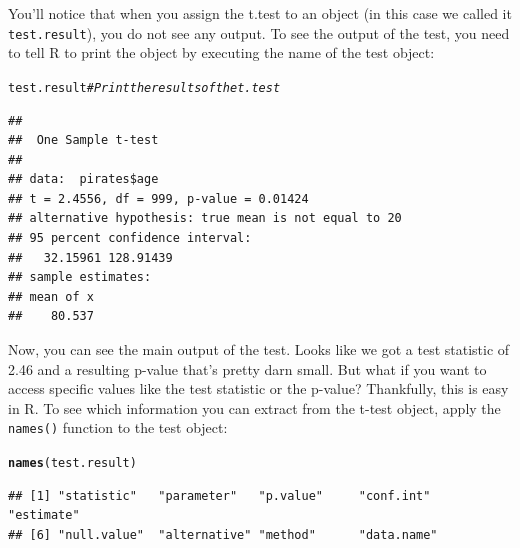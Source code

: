 \documentclass{tufte-book}\usepackage[]{graphicx}\usepackage[]{color}
\makeatletter
\newcommand{\hlcom}[1]{\textcolor[rgb]{0.678,0.584,0.686}{\textit{#1}}}%
\newcommand{\hlstd}[1]{\textcolor[rgb]{0.345,0.345,0.345}{#1}}%
\newcommand{\hlkwd}[1]{\textcolor[rgb]{0.737,0.353,0.396}{\textbf{#1}}}%
\newenvironment{kframe}{%
 \def\at@end@of@kframe{}%
 \ifinner\ifhmode%
  \def\at@end@of@kframe{\end{minipage}}%
  \begin{minipage}{\columnwidth}%
 \fi\fi%
 \def\FrameCommand##1{\hskip\@totalleftmargin \hskip-\fboxsep
 \colorbox{shadecolor}{##1}\hskip-\fboxsep
     \hskip-\linewidth \hskip-\@totalleftmargin \hskip\columnwidth}%
 \MakeFramed {\advance\hsize-\width
   \@totalleftmargin\z@ \linewidth\hsize
   \@setminipage}}%
 {\par\unskip\endMakeFramed%
 \at@end@of@kframe}
\newenvironment{knitrout}{}{} %
\makeatother
\begin{document}
\begin{footnotesize}
You'll notice that when you assign the t.test to an object (in this case we called it \texttt{test.result}), you do not see any output. To see the output of the test, you need to tell R to print the object by executing the name of the test object:

\begin{footnotesize}
\begin{knitrout}
\color{fgcolor}\begin{kframe}
\begin{alltt}
\hlstd{test.result}  \hlcom{# Print the results of the t.test}
\end{alltt}
\begin{verbatim}
## 
## 	One Sample t-test
## 
## data:  pirates$age
## t = 2.4556, df = 999, p-value = 0.01424
## alternative hypothesis: true mean is not equal to 20
## 95 percent confidence interval:
##   32.15961 128.91439
## sample estimates:
## mean of x 
##    80.537
\end{verbatim}
\end{kframe}
\end{knitrout}
\end{footnotesize}

Now, you can see the main output of the test. Looks like we got a test statistic of 2.46 and a resulting p-value that's pretty darn small. But what if you want to access specific values like the test statistic or the p-value? Thankfully, this is easy in R. To see which information you can extract from the t-test object, apply the \texttt{names()} function to the test object:


\begin{footnotesize}
\begin{knitrout}
\color{fgcolor}\begin{kframe}
\begin{alltt}
\hlkwd{names}\hlstd{(test.result)}
\end{alltt}
\begin{verbatim}
## [1] "statistic"   "parameter"   "p.value"     "conf.int"    "estimate"   
## [6] "null.value"  "alternative" "method"      "data.name"
\end{verbatim}
\end{kframe}
\end{knitrout}
\end{footnotesize}


\end{footnotesize}
\end{document}
